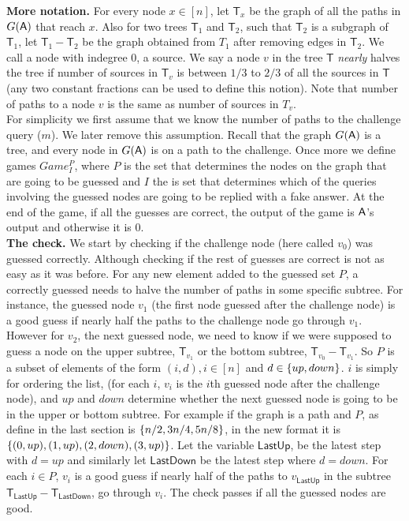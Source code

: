 \documentclass{article}
\def\A{{\sf A}}
\newcommand{\T}{{\mathsf T}}
\newcommand{\lastup}{{\mathsf {LastUp}}}
\newcommand{\lastdown}{{\mathsf {LastDown}}}
\newcommand{\gpi}{$Game^P_I$}
\begin{document}
\noindent \textbf{More notation.} For every node $x\in [n]$, let $\T_x$ be the graph of all the paths in $G(\A)$ that reach $x$. Also for two trees $\T_1$ and $\T_2$, such that $\T_2$ is a subgraph of $\T_1$, let $\T_1-\T_2$ be the graph obtained from $T_1$ after removing edges in $\T_2$. We call a node with indegree 0, a source. We say a node $v$ in the tree $\T$ \textit{nearly} halves the tree if number of sources in $\T_v$ is between $1/3$ to $2/3$ of all the sources in $\T$ (any two constant fractions can be used to define this notion). Note that number of paths to a node $v$ is the same as number of sources in $T_v$. \\

\noindent For simplicity we first assume that we know the number of paths to the challenge query ($m$). We later remove this assumption. Recall that the graph $G(\A)$ is a tree, and every node in $G(\A)$ is on a path to the challenge. Once more we define games \gpi, where $P$ is the set that determines the nodes on the graph that are going to be guessed and $I$ the is set that determines which of the queries involving the guessed nodes are going to be replied with a fake answer. At the end of the game, if all the guesses are correct, the output of the game is $\A$'s output and otherwise it is 0.\\

\noindent \textbf{The check.} We start by checking if the challenge node (here called $v_0$) was guessed correctly. Although checking if the rest of guesses are correct is not as easy as it was before. For any new element added to the guessed set $P$, a correctly guessed needs to halve the number of paths in some specific subtree. For instance, the guessed node $v_1$ (the first node guessed after the challenge node) is a good guess if nearly half the paths to the challenge node go through $v_1$. However for $v_2$, the  next guessed node, we need to know if we were supposed to guess a node on the upper subtree, $\T_{v_1}$ or the bottom subtree, $\T_{v_0}-\T_{v_1}$. So $P$ is a subset of elements of the form $(i,d), i\in [n]$ and $d \in \left\{ up,down \right\}$. $i$ is simply for ordering the list, (for each $i$, $v_i$ is the $i$th guessed node after the challenge node), and $up$ and $down$ determine whether the next guessed node is going to be in the upper or bottom subtree. For example if the graph is a path and $P$, as define in the last section is $\left\{ n/2,3n/4,5n/8 \right\}$, in the new format it is $\left\{ (0,up),(1,up), (2,down), (3,up) \right\}$. Let the variable $\lastup$, be the latest step with $d=up$ and similarly let $\lastdown$ be the latest step where $d=down$. For each $i\in P$, $v_i$ is a good guess if nearly half of the paths to $v_{\lastup}$ in the subtree $\T_{\lastup}-\T_{\lastdown}$, go through $v_i$. The check passes if all the guessed nodes are good. \\
\end{document}
